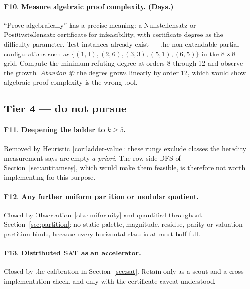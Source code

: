 \documentclass[11pt,a4paper]{article}
\theoremstyle{definition}
\begin{document}
\paragraph{F10. Measure algebraic proof complexity. (Days.)}
``Prove algebraically'' has a precise meaning: a Nullstellensatz or
Positivstellensatz certificate for infeasibility, with certificate degree as the
difficulty parameter. Test instances already exist --- the non-extendable partial
configurations such as $\{(1,4),(2,6),(3,3),(5,1),(6,5)\}$ in the $8\times8$
grid. Compute the minimum refuting degree at orders 8 through 12 and observe the
growth. \emph{Abandon if:} the degree grows linearly by order 12, which would
show algebraic proof complexity is the wrong tool.

\subsection*{Tier 4 --- do not pursue}

\paragraph{F11. Deepening the ladder to $k\ge5$.} Removed by
Heuristic~\ref{cor:ladder-value}: these rungs exclude classes the heredity
measurement says are empty \emph{a priori}. The row-side DFS of
Section~\ref{sec:antiramsey}, which would make them feasible, is therefore not
worth implementing for this purpose.

\paragraph{F12. Any further uniform partition or modular quotient.} Closed by
Observation~\ref{obs:uniformity} and quantified throughout
Section~\ref{sec:partition}: no static palette, magnitude, residue, parity or
valuation partition binds, because every horizontal class is at most half full.

\paragraph{F13. Distributed SAT as an accelerator.} Closed by the calibration in
Section~\ref{sec:sat}. Retain only as a scout and a cross-implementation check,
and only with the certificate caveat understood.
\end{document}
